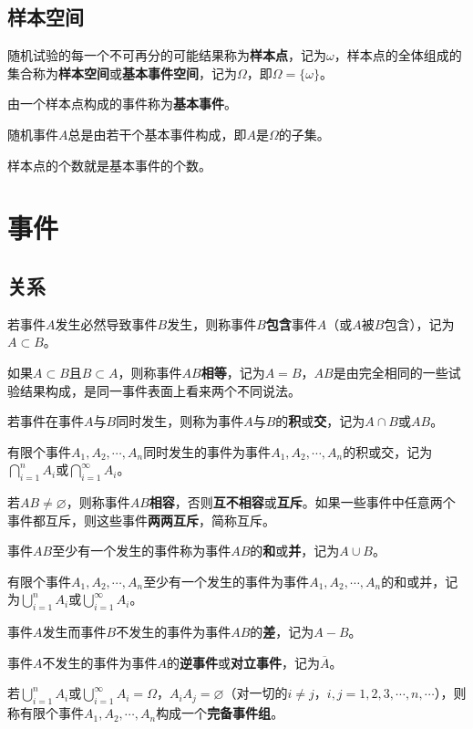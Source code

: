 \subsection{样本空间}

随机试验的每一个不可再分的可能结果称为\textbf{样本点}，记为$\omega$，样本点的全体组成的集合称为\textbf{样本空间}或\textbf{基本事件空间}，记为$\Omega$，即$\Omega=\{\omega\}$。

由一个样本点构成的事件称为\textbf{基本事件}。

随机事件$A$总是由若干个基本事件构成，即$A$是$\Omega$的子集。

样本点的个数就是基本事件的个数。

\section{事件}

\subsection{关系}

若事件$A$发生必然导致事件$B$发生，则称事件$B$\textbf{包含}事件$A$（或$A$被$B$包含），记为$A\subset B$。

如果$A\subset B$且$B\subset A$，则称事件$AB$\textbf{相等}，记为$A=B$，$AB$是由完全相同的一些试验结果构成，是同一事件表面上看来两个不同说法。

若事件在事件$A$与$B$同时发生，则称为事件$A$与$B$的\textbf{积}或\textbf{交}，记为$A\cap B$或$AB$。

有限个事件$A_1,A_2,\cdots,A_n$同时发生的事件为事件$A_1,A_2,\cdots,A_n$的积或交，记为$\bigcap\limits_{i=1}^nA_i$或$\bigcap\limits_{i=1}^\infty A_i$。

若$AB\neq\varnothing$，则称事件$AB$\textbf{相容}，否则\textbf{互不相容}或\textbf{互斥}。如果一些事件中任意两个事件都互斥，则这些事件\textbf{两两互斥}，简称互斥。

事件$AB$至少有一个发生的事件称为事件$AB$的\textbf{和}或\textbf{并}，记为$A\cup B$。

有限个事件$A_1,A_2,\cdots,A_n$至少有一个发生的事件为事件$A_1,A_2,\cdots,A_n$的和或并，记为$\bigcup\limits_{i=1}^nA_i$或$\bigcup\limits_{i=1}^\infty A_i$。

事件$A$发生而事件$B$不发生的事件为事件$AB$的\textbf{差}，记为$A-B$。

事件$A$不发生的事件为事件$A$的\textbf{逆事件}或\textbf{对立事件}，记为$\overline{A}$。

若$\bigcup\limits_{i=1}^nA_i$或$\bigcup\limits_{i=1}^\infty A_i=\Omega$，$A_iA_j=\varnothing$（对一切的$i\neq j$，$i,j=1,2,3,\cdots,n,\cdots$），则称有限个事件$A_1,A_2,\cdots,A_n$构成一个\textbf{完备事件组}。

